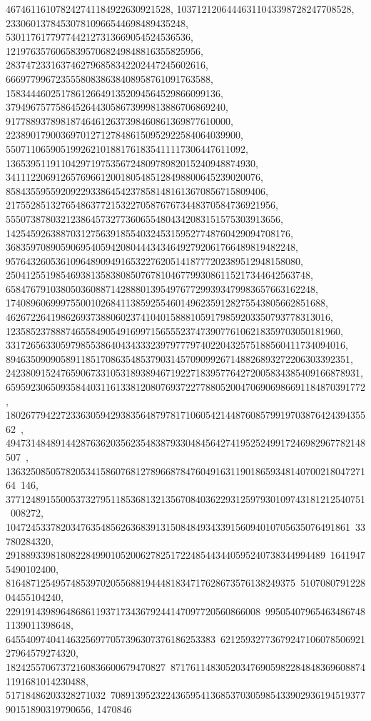 {{{   467461161078242741184922630921528, 10371212064446311043398728247708528, 
   233060137845307810966544698489435248, 
   5301176177977442127313669054524536536, 
   121976357606583957068249848816355825956, 
   2837472331637462796858342202447245602616, 
   66697799672355580838638408958761091763588, 
   1583444602517861266491352094564529866099136, 
   37949675775864526443058673999813886706869240, 
   917788937898187464612637398460861369877610000, 
   22389017900369701271278486150952922584064039900, 
   550711065905199262101881761835411117306447611092, 
   13653951191104297197535672480978982015240948874930, 
   341112206912657696612001805485128498800645239020076, 
   8584355955920922933864542378581481613670856715809406, 
   217552851327654863772153227058767673448370584736921956, 
   5550738780321238645732773606554804342083151575303913656, 
   142545926388703127563918554032453159527748760429094708176, 
   3683597089059069540594208044434346492792061766489819482248, 
   95764326053610964890949165322762051418777202389512948158080, 
   2504125519854693813583808507678104677993086115217344642563748, 
   65847679103805036088714288801395497677299393479983657663162248, 
   1740896069997550010268411385925546014962359128275543805662851688, 
   46267226419862693738806023741040158881059179859203350793778313016, 
   1235852378887465584905491699715655523747390776106218359703050181960, 
   33172656330597985538640434333239797779740220432575188560411734094016, 
   894635090905891185170863548537903145709099267148826893272206303392351, 
   24238091524765906733105318938946719227183957764272005834385409166878931, 
   659592306509358440311613381208076937227788052004706906986691184870391772, 
   18026779422723363059429383564879781710605421448760857991970387642439435562\
, 
   494731484891442876362035623548387933048456427419525249917246982967782148507\
, 
   13632508505782053415860768127896687847604916311901865934814070021804727164\
146, 377124891550053732795118536813213567084036229312597930109743181212540751\
008272, 104724533782034763548562636839131508484934339156094010705635076491861\
33780284320, 2918893398180822849901052006278251722485443440595240738344994489\
16419475490102400, 8164871254957485397020556881944481834717628673576138249375\
510708079122804455104240, 229191439896486861193717343679244147097720560866008\
995054079654634867481139011398648, 645540974041463256977057396307376186253383\
6212593277367924710607850692127964579274320, 18242557067372160836600679470827\
8717611483052034769059822848483696088741191681014230488, 51718486203328271032\
70891395232243659541368537030598543390293619451937790151890319790656, 1470846\
}}}
